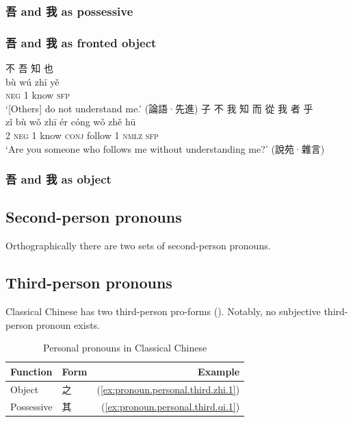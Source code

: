 \documentclass[UTF8, a4paper, oneside, scheme=plain, 12pt]{ctexrep}
\newcommand{\translate}[1]{`#1'}
\newcommand*{\category}[1]{\textsc{#1}}
\begin{document}
\subsubsection{吾 and 我 as possessive}

\subsubsection{吾 and 我 as fronted object}

\begin{exe}
    \ex\label{ex:pronoun.personal.first.wu.1}
    \glll 不 吾 知 也 \\
    bù wú zhī yě \\
    \category{neg} 1 know \category{sfp} \\
    \glt\translate{[Others] do not understand me.} \hfill (論語·先進)
    \ex\label{ex:pronoun.personal.first.fronted-object.2}
    \glll 子 不 我 知 而 從 我 者 乎 \\
    zǐ bù wǒ zhī ér cóng wǒ zhě hū \\
    2 \category{neg} 1 know \category{conj} follow 1 \category{nmlz} \category{sfp} \\
    \glt\translate{Are you someone who follows me without understanding me?} \hfill (說苑·雜言)
\end{exe}

\subsubsection{吾 and 我 as object}

\subsection{Second-person pronouns}

Orthographically there are two sets of second-person pronouns.


\subsection{Third-person pronouns}

Classical Chinese has two third-person pro-forms ().
Notably, no subjective third-person pronoun exists.

\begin{table}[H]
    \caption{Personal pronouns in Classical Chinese}
    \label{tbl:third-personal-pronouns}
    \centering
    \begin{tabular}{llr}
        \toprule
        Function & Form & Example \\
        \midrule
        Object &     之 & (\ref{ex:pronoun.personal.third.zhi.1}) \\
        Possessive & 其 & (\ref{ex:pronoun.personal.third.qi.1}) \\
        \bottomrule
    \end{tabular}
\end{table}
\end{document}
